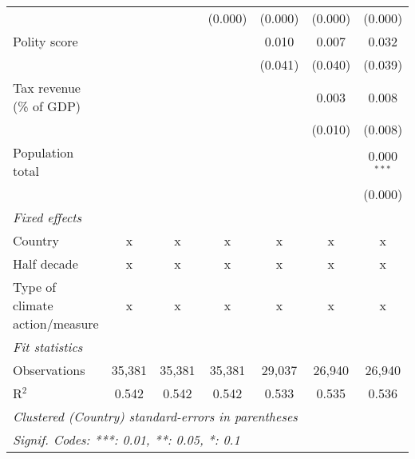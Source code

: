 \begin{tabular}{lcccccc}
                                                                                 &                &                & (0.000)        & (0.000)        & (0.000)        & (0.000)\\   
   Polity score                                                                  &                &                &                & 0.010          & 0.007          & 0.032\\   
                                                                                 &                &                &                & (0.041)        & (0.040)        & (0.039)\\   
   Tax revenue (\% of GDP)                                                       &                &                &                &                & 0.003          & 0.008\\   
                                                                                 &                &                &                &                & (0.010)        & (0.008)\\   
   Population total                                                              &                &                &                &                &                & 0.000$^{***}$\\   
                                                                                 &                &                &                &                &                & (0.000)\\   
   \emph{Fixed effects}\\
   Country                                                                       & x              & x              & x              & x              & x              & x\\  
   Half decade                                                                   & x              & x              & x              & x              & x              & x\\  
   Type of climate action/measure                                                & x              & x              & x              & x              & x              & x\\  
   \midrule \emph{Fit statistics}\\
   Observations                                                                  & 35,381         & 35,381         & 35,381         & 29,037         & 26,940         & 26,940\\  
   R$^2$                                                                         & 0.542          & 0.542          & 0.542          & 0.533          & 0.535          & 0.536\\  
   \midrule
   \multicolumn{7}{l}{\emph{Clustered (Country) standard-errors in parentheses}}\\
   \multicolumn{7}{l}{\emph{Signif. Codes: ***: 0.01, **: 0.05, *: 0.1}}\\
\end{tabular}
\par\endgroup



